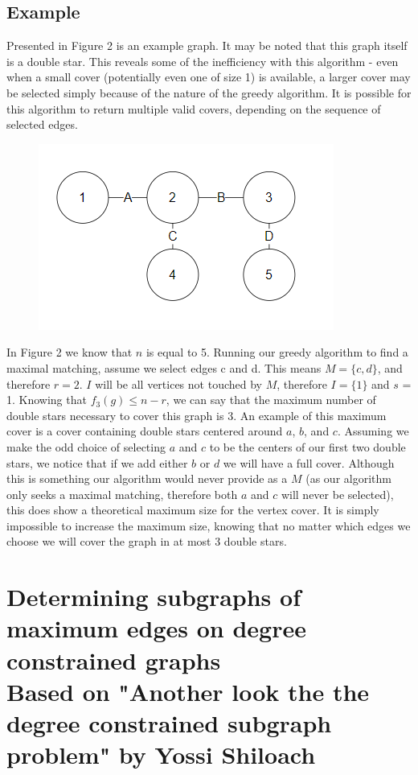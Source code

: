 \documentclass{article}
\begin{document}
		\subsection{Example}
		Presented in Figure 2 is an example graph. It may be noted that this graph itself is a double star. This reveals some of the inefficiency with this algorithm - even when a small cover (potentially even one of size 1) is available, a larger cover may be selected simply because of the nature of the greedy algorithm. It is possible for this algorithm to return multiple valid covers, depending on the sequence of selected edges.
		 \\
				\begin{figure}[H]
				\caption{}
				\includegraphics{Figure2}
			\end{figure}
			In Figure 2 we know that $n$ is equal to 5. Running our greedy algorithm to find a maximal matching, assume we select edges c and d. This means $M = \{c,d\}$, and therefore $r = 2$. $I$ will be all vertices not touched by $M$, therefore $I = \{1\}$ and $s$ = 1. Knowing that $f_{3}(g) \leq n-r$, we can say that the maximum number of double stars necessary to cover this graph is 3. An example of this maximum cover is a cover containing double stars centered around $a$, $b$, and $c$. Assuming we make the odd choice of selecting $a$ and $c$ to be the centers of our first two double stars, we notice that if we add either $b$ or $d$ we will have a full cover. Although this is something our algorithm would never provide as a $M$ (as our algorithm only seeks a maximal matching, therefore both $a$ and $c$ will never be selected), this does show a theoretical maximum size for the vertex cover. It is simply impossible to increase the maximum size, knowing that no matter which edges we choose we will cover the graph in at most 3 double stars.
			
	\section{Determining subgraphs of maximum edges on degree constrained graphs \\ {\small Based on "Another look the the degree constrained subgraph problem" by Yossi Shiloach \cite{2}}  }
\end{document}
